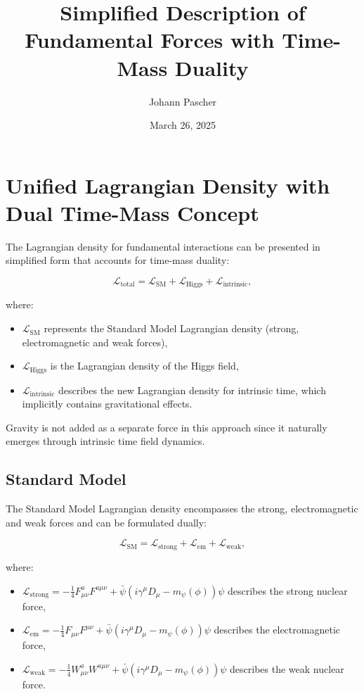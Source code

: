 \documentclass{article}
\title{Simplified Description of Fundamental Forces with Time-Mass Duality}
\author{Johann Pascher}
\date{March 26, 2025}
\begin{document}
	\maketitle
	
	\tableofcontents
	\newpage
	
	\section{Unified Lagrangian Density with Dual Time-Mass Concept}
	
	The Lagrangian density for fundamental interactions can be presented in simplified form that accounts for time-mass duality:
	
	\begin{equation}
		\mathcal{L}_\text{total} = \mathcal{L}_\text{SM} + \mathcal{L}_\text{Higgs} + \mathcal{L}_\text{intrinsic},
	\end{equation}
	
	where:
	\begin{itemize}
		\item $\mathcal{L}_\text{SM}$ represents the Standard Model Lagrangian density (strong, electromagnetic and weak forces),
		\item $\mathcal{L}_\text{Higgs}$ is the Lagrangian density of the Higgs field,
		\item $\mathcal{L}_\text{intrinsic}$ describes the new Lagrangian density for intrinsic time, which implicitly contains gravitational effects.
	\end{itemize}
	
	Gravity is not added as a separate force in this approach since it naturally emerges through intrinsic time field dynamics.
	
	\subsection{Standard Model}
	The Standard Model Lagrangian density encompasses the strong, electromagnetic and weak forces and can be formulated dually:
	
	\begin{equation}
		\mathcal{L}_\text{SM} = \mathcal{L}_\text{strong} + \mathcal{L}_\text{em} + \mathcal{L}_\text{weak},
	\end{equation}
	
	where:
	\begin{itemize}
		\item $\mathcal{L}_\text{strong} = -\frac{1}{4} F_{\mu\nu}^a F^{a\mu\nu} + \bar{\psi}(i \gamma^\mu D_\mu - m_\psi(\phi))\psi$ describes the strong nuclear force,
		\item $\mathcal{L}_\text{em} = -\frac{1}{4} F_{\mu\nu} F^{\mu\nu} + \bar{\psi}(i \gamma^\mu D_\mu - m_\psi(\phi))\psi$ describes the electromagnetic force,
		\item $\mathcal{L}_\text{weak} = -\frac{1}{4} W_{\mu\nu}^a W^{a\mu\nu} + \bar{\psi}(i \gamma^\mu D_\mu - m_\psi(\phi))\psi$ describes the weak nuclear force.
	\end{itemize}
	
\end{document}
